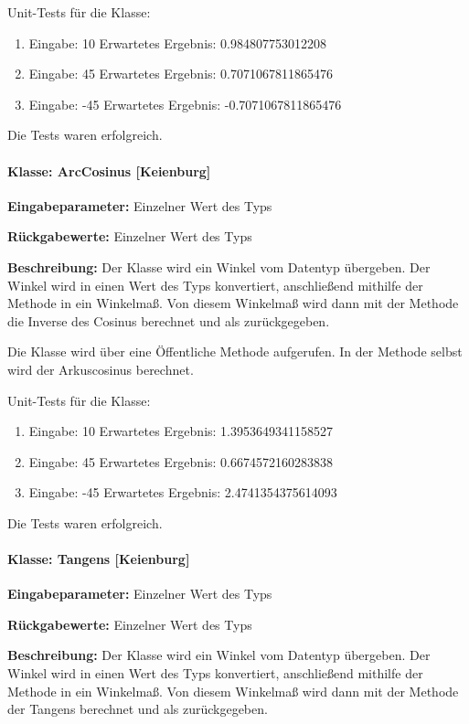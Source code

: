 Unit-Tests für die Klasse: 	
\begin{enumerate}
	\item Eingabe:  10 Erwartetes Ergebnis: 0.984807753012208
	\item Eingabe:  45 Erwartetes Ergebnis: 0.7071067811865476
	\item Eingabe: -45 Erwartetes Ergebnis: -0.7071067811865476
\end{enumerate}
Die Tests waren erfolgreich.

\paragraph{Klasse: ArcCosinus [Keienburg]}
\textbf{Eingabeparameter: } Einzelner Wert des Typs 

\textbf{Rückgabewerte: } Einzelner Wert des Typs 

\textbf{Beschreibung: } Der Klasse wird ein Winkel vom Datentyp  übergeben. Der Winkel wird in einen Wert des Typs  konvertiert, anschließend mithilfe der Methode  in ein Winkelmaß. Von diesem Winkelmaß wird dann mit der Methode  die Inverse des Cosinus berechnet und als  zurückgegeben.  

Die Klasse wird über eine Öffentliche Methode aufgerufen. In der Methode selbst wird der Arkuscosinus berechnet. 

Unit-Tests für die Klasse: 	
\begin{enumerate}
	\item Eingabe:  10 Erwartetes Ergebnis: 1.3953649341158527
	\item Eingabe:  45 Erwartetes Ergebnis: 0.6674572160283838
	\item Eingabe: -45 Erwartetes Ergebnis: 2.4741354375614093
\end{enumerate}
Die Tests waren erfolgreich.

\paragraph{Klasse: Tangens [Keienburg]}
\textbf{Eingabeparameter: } Einzelner Wert des Typs 

\textbf{Rückgabewerte: } Einzelner Wert des Typs 

\textbf{Beschreibung: } Der Klasse wird ein Winkel vom Datentyp  übergeben. Der Winkel wird in einen Wert des Typs  konvertiert, anschließend mithilfe der Methode  in ein Winkelmaß. Von diesem Winkelmaß wird dann mit der Methode  der Tangens berechnet und als  zurückgegeben.  

